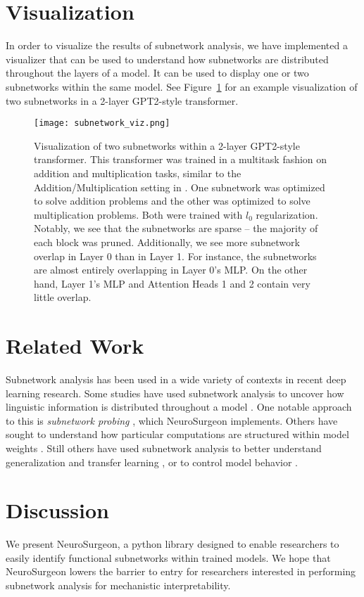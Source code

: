 \documentclass[11pt]{article}
\begin{document}
\section{Visualization}
In order to visualize the results of subnetwork analysis, we have implemented a visualizer that can be used to understand how subnetworks are distributed throughout the layers of a model. It can be used to display one or two subnetworks within the same model. See Figure~\ref{viz_fig} for an example visualization of two subnetworks in a 2-layer GPT2-style transformer.

\begin{figure}
\centering
\texttt{[image: subnetwork\_viz.png]}
\caption{Visualization of two subnetworks within a 2-layer GPT2-style transformer. This transformer was trained in a multitask fashion on addition and multiplication tasks, similar to the Addition/Multiplication setting in \citet{csordas2020neural}. One subnetwork was optimized to solve addition problems and the other was optimized to solve multiplication problems. Both were trained with $l_0$ regularization. Notably, we see that the subnetworks are sparse -- the majority of each block was pruned. Additionally, we see more subnetwork overlap in Layer 0 than in Layer 1. For instance, the subnetworks are almost entirely overlapping in Layer 0's MLP. On the other hand, Layer 1's MLP and Attention Heads 1 and 2 contain very little overlap.}
\label{viz_fig}
\end{figure}

\section{Related Work}
Subnetwork analysis has been used in a wide variety of contexts in recent deep learning research. Some studies have used subnetwork analysis to uncover how linguistic information is distributed throughout a model \cite{de2022sparse, de2020decisions}. One notable approach to this is \textit{subnetwork probing} \cite{cao2021low}, which NeuroSurgeon implements. Others have sought to understand how particular computations are structured within model weights \cite{csordas2020neural, lepori2023break, conmy2023towards}. Still others have used subnetwork analysis to better understand generalization and transfer learning \cite{zhang2021can, panigrahi2023task, zheng2023regularized, guo2021parameter}, or to control model behavior \cite{li2023circuit}.


\section{Discussion}
We present NeuroSurgeon, a python library designed to enable researchers to easily identify functional subnetworks within trained models. We hope that NeuroSurgeon lowers the barrier to entry for researchers interested in performing subnetwork analysis for mechanistic interpretability.


\end{document}
